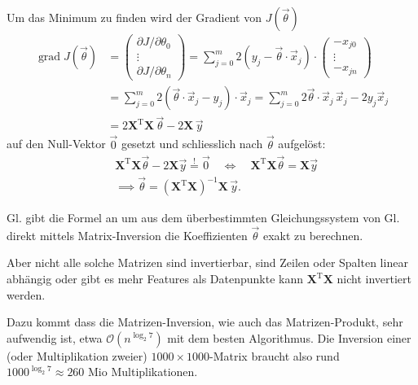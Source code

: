 Um das Minimum zu finden wird der Gradient von $J(\vec \theta)$ 
\begin{align}
    \operatorname{grad} J(\vec \theta) &=
    \begin{pmatrix} \partial J / \partial \theta_0 \\ \vdots \\ \partial J / \partial \theta_n \end{pmatrix}
    = \sum_{j = 0}^{m} 2 (y_j - \vec \theta \cdot \vec x_j) \cdot
    \begin{pmatrix} - x_{j0}\\ \vdots \\ - x_{jn} \end{pmatrix} \nonumber\\
    &= \sum_{j = 0}^{m} 2 \left( \vec \theta \cdot \vec x_j - y_j \right) \cdot \vec x_j
    = \sum_{j = 0}^{m} 2 \vec \theta \cdot \vec x_j\, \vec x_j - 2 y_j \vec x_j \nonumber\\
    &= 2 \mathbf{X}^\mathrm{T} \mathbf{X}\, \vec \theta - 2 \mathbf{X}\, \vec y
    \label{ml:regression:lstsq:grad}
\end{align}
auf den Null-Vektor $\vec 0$ gesetzt
und schliesslich nach $\vec \theta$ aufgelöst:
\begin{align}
    &\mathbf{X}^\mathrm{T} \mathbf{X} \vec \theta - 2 \mathbf{X} \vec y \overset{!}= \vec 0 \quad\Leftrightarrow\quad
    \mathbf{X}^\mathrm{T} \mathbf{X} \vec \theta = \mathbf{X} \vec y \nonumber\\
    &\implies \vec \theta = \left( \mathbf{X}^\mathrm{T} \mathbf{X} \right)^{-1} \mathbf{X} \, \vec y.
    \label{ml:regression:lstsq:formel}
\end{align}

Gl.  gibt die Formel an um aus dem überbestimmten
Gleichungssystem von Gl.  direkt mittels Matrix-Inversion
die Koeffizienten $\vec \theta$ exakt zu berechnen.

\bigskip
Aber nicht alle solche Matrizen sind invertierbar, sind Zeilen oder Spalten linear
abhängig oder gibt es mehr Features als Datenpunkte kann $\mathbf{X}^\mathrm{T}\mathbf{X}$
nicht invertiert werden.

Dazu kommt dass die Matrizen-Inversion, wie auch das Matrizen-Produkt, sehr aufwendig ist,
etwa $\mathcal{O}(n^{\log_2 7})$ mit dem besten Algorithmus. Die Inversion  einer (oder
Multiplikation zweier) $1000 \times 1000$-Matrix braucht also rund $1000^{\log_2 7}
\approx 260$ Mio Multiplikationen.
\cite{ml:computational-complexity-math-op}

